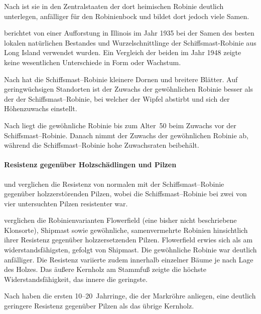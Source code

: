 \documentclass[twocolumn]{scrartcl}
\begin{document}
Nach \citet[S.~321]{usForestService1948seedManual} ist sie in den
Zentralstaaten der dort heimischen Robinie deutlich unterlegen,
anfälliger für den Robinienbock und bildet dort jedoch viele Samen.

\citet{minckler1948robinie} berichtet von einer Aufforstung in Illinois
im Jahr 1935 bei der Samen des besten lokalen natürlichen Bestandes
und Wurzelschnittlinge der Schiffsmast-Robinie aus Long Island
verwendet wurden. Ein Vergleich der beiden im Jahr 1948 zeigte keine
wesentlichen Unterschiede in Form oder Wachstum.

Nach \citet{hopp1941robinieUnterschied} hat die
Schiffsmast--Robinie kleinere Dornen und breitere Blätter. Auf
geringwüchsigen Standorten ist der Zuwachs der gewöhnlichen Robinie
besser als der der Schiffsmast--Robinie, bei welcher der Wipfel
abstirbt und sich der Höhenzuwachs einstellt.

Nach \citet{hopp1947robinie} liegt die gewöhnliche Robinie bis zum Alter~50
beim Zuwachs vor der
Schiffsmast--Robinie. Danach nimmt der Zuwachs der gewöhnlichen
Robinie ab, während die Schiffsmast--Robinie hohe Zuwachsraten
beibehält.

\paragraph{Resistenz gegenüber Holzschädlingen und Pilzen}

\citet{hirt1938robinie} und \citet{toole1938robinie} verglichen die
Resistenz von normalen mit der Schiffsmast--Robinie gegenüber
holzzerstörenden Pilzen, wobei die Schiffsmast--Robinie bei zwei von
vier untersuchten Pilzen resistenter war.

\citet{scheffer1949robinieDecay} verglichen die Robinienvarianten
Flowerfield (eine bisher nicht beschriebene Klonsorte), Shipmast sowie
gewöhnliche, samenvermehrte Robinien hinsichtlich ihrer Resistenz
gegenüber holzzersetzenden Pilzen. Flowerfield erwies sich als am
widerstandsfähigsten, gefolgt von Shipmast. Die gewöhnliche Robinie
war deutlich anfälliger. Die Resistenz variierte zudem innerhalb
einzelner Bäume je nach Lage des Holzes. Das äußere Kernholz am
Stammfuß zeigte die höchste Widerstandsfähigkeit, das innere die
geringste.

Nach \citet{duenisch2009robineHolzJungAlt} haben die ersten
10--20~Jahrringe, die der Markröhre anliegen, eine deutlich geringere
Resistenz gegenüber Pilzen als das übrige Kernholz.
\end{document}

